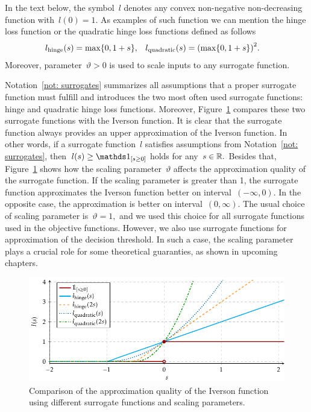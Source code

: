 \begin{notation}\label{not: surrogates}
  In the text below, the symbol~$l$ denotes any convex non-negative non-decreasing function with~$l(0) = 1$. As examples of such function we can mention the hinge loss function or the quadratic hinge loss functions defined as follows
  \begin{align*}
    l_{\text{hinge}}(s) & = \max\Brac[c]{0, 1 + s}, &
    l_{\text{quadratic}}(s) & = \Brac{\max\Brac[c]{0, 1 + s}}^2.
  \end{align*}
  Moreover, parameter~$\vartheta > 0$ is used to scale inputs to any surrogate function.
\end{notation}

Notation~\ref{not: surrogates} summarizes all assumptions that a proper surrogate function must fulfill and introduces the two most often used surrogate functions: hinge and quadratic hinge loss functions. Moreover, Figure~\ref{fig: surrogates} compares these two surrogate functions with the Iverson function. It is clear that the surrogate function always provides  an upper approximation of the Iverson function. In other words, if a surrogate function~$l$ satisfies assumptions from Notation~\ref{not: surrogates}, then~$l(s) \geq \Iverson{s \geq 0}$ holds for any~$s \in \mathbb{R}.$ Besides that, Figure~\ref{fig: surrogates} shows how the scaling parameter~$\vartheta$ affects the approximation quality of the surrogate function. If the scaling parameter is greater than 1, the surrogate function approximates the Iverson function better on interval~$(-\infty, 0)$. In the opposite case, the approximation is better on interval~$(0, \infty)$. The usual choice of scaling parameter is~$\vartheta = 1,$ and we used this choice for all surrogate functions used in the objective functions. However, we also use surrogate functions for approximation of the decision threshold. In such a case, the scaling parameter plays a crucial role for some theoretical guaranties, as shown in upcoming chapters.

\begin{figure}[t]
  \centering
  \includegraphics[width = \linewidth]{images/surrogates.pdf}
  \caption{Comparison of the approximation quality of the Iverson function using different surrogate functions and scaling parameters.}
  \label{fig: surrogates}
\end{figure}

